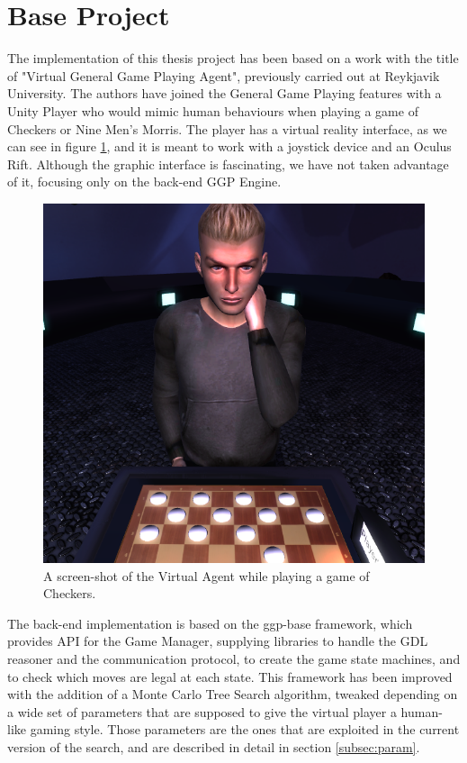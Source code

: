 \section{Base Project}\label{sec:baseprojme}
The implementation of this thesis project has been based on a work with the title of "Virtual General Game Playing Agent"\cite{helgadottir2016virtual}, previously carried out at Reykjavik University. The authors have joined the General Game Playing features with a Unity Player who would mimic human behaviours when playing a game of Checkers or Nine Men's Morris. The player has a virtual reality interface, as we can see in figure \ref{fig:virtualagent}, and it is meant to work with a joystick device and an Oculus Rift. Although the graphic interface is fascinating, we have not taken advantage of it, focusing only on the back-end GGP Engine.\\
\begin{figure}[ht]
\centering
	\includegraphics[scale=0.3]{figure/virtualagent}
    \caption{A screen-shot of the Virtual Agent while playing a game of Checkers.}
    \label{fig:virtualagent}
\end{figure}
The back-end implementation is based on the ggp-base framework\cite{schreiber2013general}, which provides API for the Game Manager, supplying libraries to handle the GDL reasoner and the communication protocol, to create the game state machines, and to check which moves are legal at each state. This framework has been improved with the addition of a Monte Carlo Tree Search algorithm, tweaked depending on a wide set of parameters that are supposed to give the virtual player a human-like gaming style. Those parameters are the ones that are exploited in the current version of the search, and are described in detail in section \ref{subsec:param}.\\
